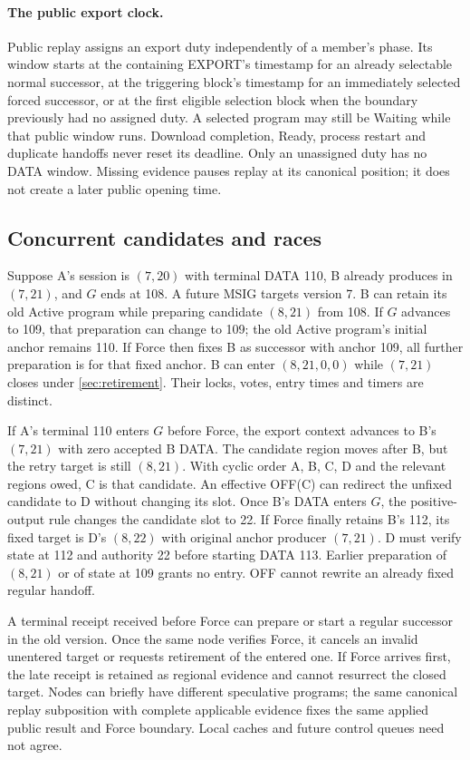 \documentclass[11pt,a4paper]{article}
\begin{document}
\paragraph{The public export clock.}
Public replay assigns an export duty independently of a member's
phase. Its window starts at the containing EXPORT's timestamp for
an already selectable normal successor, at the triggering block's
timestamp for an immediately selected forced successor, or at the
first eligible selection block when the boundary previously had no
assigned duty. A selected program may still be Waiting while that
public window runs. Download completion, Ready, process restart and
duplicate handoffs never reset its deadline. Only an unassigned duty
has no DATA window. Missing evidence pauses replay at its canonical
position; it does not create a later public opening time.

\subsection{Concurrent candidates and races}
\label{sec:runtime-races}
Suppose A's session is $(7,20)$ with terminal DATA 110, B already
produces in $(7,21)$, and $G$ ends at 108. A future MSIG targets
version 7. B can retain its old Active program while preparing
candidate $(8,21)$ from 108. If $G$ advances to 109, that preparation
can change to 109; the old Active program's initial anchor remains
110. If Force then fixes B as successor with anchor 109, all further
preparation is for that fixed anchor. B can enter $(8,21,0,0)$ while
$(7,21)$ closes under \cref{sec:retirement}. Their locks, votes,
entry times and timers are distinct.

If A's terminal 110 enters $G$ before Force, the export context
advances to B's $(7,21)$ with zero accepted B DATA. The candidate region
moves after B, but the retry target is still $(8,21)$. With cyclic order
A, B, C, D and the relevant regions owed, C is that candidate. An effective
OFF(C) can redirect the unfixed candidate to D without changing its slot.
Once B's DATA enters $G$, the positive-output rule changes the candidate
slot to 22. If Force finally retains B's 112, its fixed target is D's
$(8,22)$ with original anchor producer $(7,21)$. D must verify state at
112 and authority 22 before starting DATA 113.
Earlier preparation of $(8,21)$ or of state at 109 grants no entry.
OFF cannot rewrite an already fixed regular handoff.

A terminal receipt received before Force can prepare or start a
regular successor in the old version. Once the same node verifies
Force, it cancels an invalid unentered target or requests retirement
of the entered one. If Force arrives first, the late receipt is
retained as regional evidence and cannot resurrect the closed target.
Nodes can briefly have different speculative programs; the same
canonical replay subposition with complete applicable evidence fixes
the same applied public result and Force boundary. Local caches and
future control queues need not agree.
\end{document}
